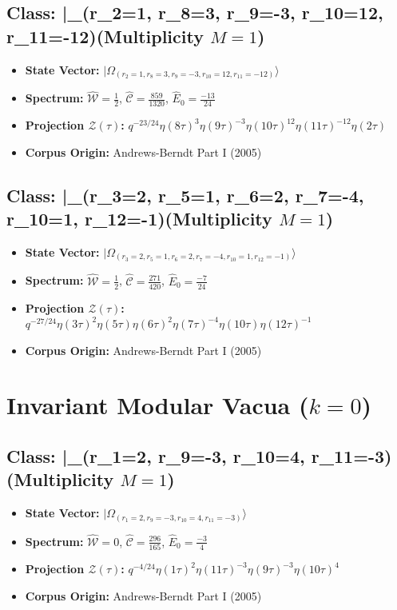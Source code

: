 \documentclass[11pt,twoside,openright]{book}
\begin{document}
\section*{Class: |\Omega_{(r_{2}=1, r_{8}=3, r_{9}=-3, r_{10}=12, r_{11}=-12)}\rangle (Multiplicity $M=1$)}
\begin{itemize}
  \item \textbf{State Vector:} $|\Omega_{(r_{2}=1, r_{8}=3, r_{9}=-3, r_{10}=12, r_{11}=-12)}\rangle$
  \item \textbf{Spectrum:} $\hat{\mathcal{W}} = \frac{1}{2}$, $\hat{\mathcal{C}} = \frac{859}{1320}$, $\hat{E}_0 = \frac{-13}{24}$
  \item \textbf{Projection $\mathcal{Z}(\tau)$:} $q^{-23/24} \eta(8\tau)^{3} \eta(9\tau)^{-3} \eta(10\tau)^{12} \eta(11\tau)^{-12} \eta(2\tau)$
  \item \textbf{Corpus Origin:} Andrews-Berndt Part I (2005)
\end{itemize}

\section*{Class: |\Omega_{(r_{3}=2, r_{5}=1, r_{6}=2, r_{7}=-4, r_{10}=1, r_{12}=-1)}\rangle (Multiplicity $M=1$)}
\begin{itemize}
  \item \textbf{State Vector:} $|\Omega_{(r_{3}=2, r_{5}=1, r_{6}=2, r_{7}=-4, r_{10}=1, r_{12}=-1)}\rangle$
  \item \textbf{Spectrum:} $\hat{\mathcal{W}} = \frac{1}{2}$, $\hat{\mathcal{C}} = \frac{271}{420}$, $\hat{E}_0 = \frac{-7}{24}$
  \item \textbf{Projection $\mathcal{Z}(\tau)$:} $q^{-27/24} \eta(3\tau)^{2} \eta(5\tau) \eta(6\tau)^{2} \eta(7\tau)^{-4} \eta(10\tau) \eta(12\tau)^{-1}$
  \item \textbf{Corpus Origin:} Andrews-Berndt Part I (2005)
\end{itemize}


\chapter{Invariant Modular Vacua ($k = 0$)}
\section*{Class: |\Omega_{(r_{1}=2, r_{9}=-3, r_{10}=4, r_{11}=-3)}\rangle (Multiplicity $M=1$)}
\begin{itemize}
  \item \textbf{State Vector:} $|\Omega_{(r_{1}=2, r_{9}=-3, r_{10}=4, r_{11}=-3)}\rangle$
  \item \textbf{Spectrum:} $\hat{\mathcal{W}} = 0$, $\hat{\mathcal{C}} = \frac{296}{165}$, $\hat{E}_0 = \frac{-3}{4}$
  \item \textbf{Projection $\mathcal{Z}(\tau)$:} $q^{-4/24} \eta(1\tau)^{2} \eta(11\tau)^{-3} \eta(9\tau)^{-3} \eta(10\tau)^{4}$
  \item \textbf{Corpus Origin:} Andrews-Berndt Part I (2005)
\end{itemize}
\end{document}
